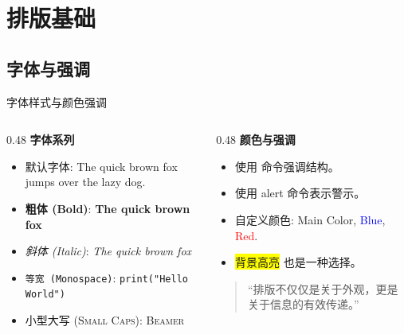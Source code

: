 \section{排版基础}

\subsection{字体与强调}
\begin{frame}{字体样式与颜色强调}
    \begin{columns}[T]
        \begin{column}{0.48\textwidth}
            \textbf{\color{main} 字体系列}
            \begin{itemize}
                \item 默认字体: The quick brown fox jumps over the lazy dog.
                \item \textbf{粗体 (Bold)}: \textbf{The quick brown fox}
                \item \textit{斜体 (Italic)}: \textit{The quick brown fox}
                \item \texttt{等宽 (Monospace)}: \texttt{print("Hello World")}
                \item \textsc{小型大写 (Small Caps)}: \textsc{Beamer}
            \end{itemize}
        \end{column}
        \begin{column}{0.48\textwidth}
            \textbf{\color{main} 颜色与强调}
            \begin{itemize}
                \item 使用  命令强调结构。
                \item 使用 \alert{alert} 命令表示警示。
                \item 自定义颜色: \textcolor{main}{Main Color}, \textcolor{blue}{Blue}, \textcolor{red}{Red}.
                \item \colorbox{yellow}{背景高亮} 也是一种选择。
            \end{itemize}
            \vspace{1em}
            \begin{quote}
                ``排版不仅仅是关于外观，更是关于信息的有效传递。''
            \end{quote}
        \end{column}
    \end{columns}
\end{frame}

